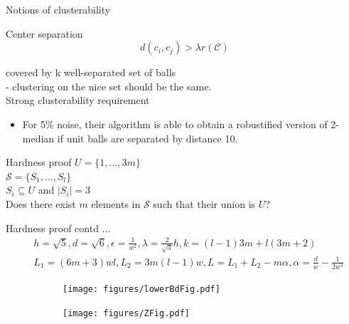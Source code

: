 \documentclass{beamer}
\newcommand{\mc}{\mathcal}
\begin{document}
\begin{frame}{Notions of clusterability}
	
	{\color{blue} Center separation}\\
	$$ d(c_i, c_j) > \lambda r(\mc C) $$

	covered by k well-separated set of balls \\
	
	 - clustering on the nice set should be the same.\\
	
	\vspace{1cm}\alert{Strong clusterability requirement}\\
	\begin{itemize}
		\item 	For 5\% noise, their algorithm is able to obtain a robustified version of 2-median if unit balls are separated by distance 10.

	\end{itemize}
\end{frame}

\begin{frame}{Hardness proof}
	$U = \{1, \ldots, 3m\}$ \\ 
	$\mc S = \{S_1, \ldots, S_l\}$ \\
	$S_i \subseteq U$ and $|S_i| = 3$\\ 
	
	\vspace{1cm} Does there exist $m$ elements in $\mc S$ such that their union is $U$? 	
\end{frame}

\begin{frame}{Hardness proof contd $\ldots$}
	\begin{align*}
	&h = \sqrt{5}, d = \sqrt{6}, \epsilon = \frac{1}{w^2}, \lambda = \frac{2}{\sqrt{3}}h, k = (l-1)3m + l(3m+2)\\
	& L_1 = (6m+3)wl, L_2 = 3m(l-1)w, L = L_1 + L_2 - m\alpha, \alpha = \frac{d}{w}-\frac{1}{2w^3}
	\end{align*}
	
	\begin{figure}
		\begin{subfigure}{.5\textwidth}
		\texttt{[image: figures/lowerBdFig.pdf]}
		\end{subfigure}
		\begin{subfigure}{.5\textwidth}
		\texttt{[image: figures/ZFig.pdf]}
		\end{subfigure}
	\end{figure}
	
	
\end{frame}
\end{document}
